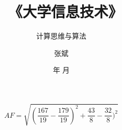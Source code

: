 \documentclass[dvipsnames, svgnames, x11names]{beamer}
\title{\ 《大学信息技术》}
\subtitle{计算思维与算法}
\author{张斌}
\institute[理工系]{河北农业大学 理工系}
\date{\the\year 年 \the\month 月}
\begin{document}
\begin{frame}
    \frametitle{}
    \[
        AF = \sqrt{(\frac{167}{19}-\frac{179}{19})^2+\frac{43}{8}-\frac{32}{8})^2}
    \]
\end{frame}
\end{document}

